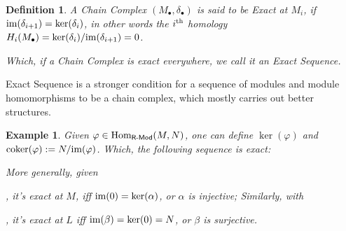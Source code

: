 \documentclass[x11names,reqno,12pt]{extarticle}
\newtheorem{defn}{Definition}
\newtheorem{exm}{Example}
\newcommand{\coker}{\textmd{coker}}
\newcommand{\Hom}{\textmd{Hom}}
\newcommand{\cat}[1]{\textsf{#1}}
\begin{document}
\begin{defn}
    A Chain Complex $(M_\bullet,\delta_\bullet)$ is said to be \emph{Exact} at $M_i$, if $\textmd{im}(\delta_{i+1})=\ker(\delta_i)$, in other words the $i^\textmd{th}$ homology $H_i(M_\bullet) = \ker(\delta_i)/\textmd{im}(\delta_{i+1}) = 0$.

    Which, if a Chain Complex is exact everywhere, we call it an \emph{Exact Sequence}.
\end{defn}
Exact Sequence is a stronger condition for a sequence of modules and module homomorphisms to be a chain complex, which mostly carries out better structures.
\begin{exm}
    Given $\varphi\in \Hom_{\cat{R-Mod}}(M,N)$, one can define $\ker(\varphi)$ and $\coker(\varphi):= N/\textmd{im}(\varphi)$. Which, the following sequence is exact:
    \begin{center}
    \end{center}
    More generally, given , it's exact at $M$, iff $\textmd{im}(0) = \ker(\alpha)$, or $\alpha$ is injective; Similarly, with , it's exact at $L$ iff $\textmd{im}(\beta) = \ker(0) = N$, or $\beta$ is surjective.
\end{exm}

\hfill
\end{document}
